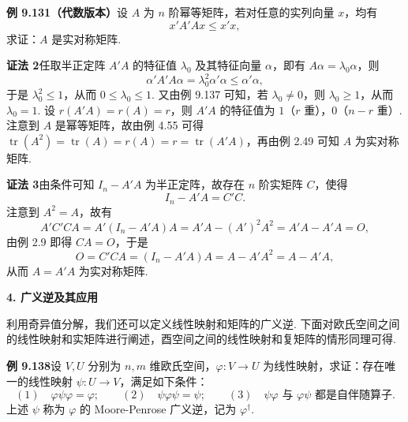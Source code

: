 \documentclass[UTF8,12pt,a4paper,fontset=fandol]{ctexart}
\begin{document}
\noindent\textbf{例 9.131（代数版本）}\quad 设 $A$ 为 $n$ 阶幂等矩阵，若对任意的实列向量 $x$，均有
\[
x'A'Ax\le x'x,
\]
求证：$A$ 是实对称矩阵.

\noindent\textbf{证法 2}\quad 任取半正定阵 $A'A$ 的特征值 $\lambda_0$ 及其特征向量 $\alpha$，即有 $A\alpha=\lambda_0\alpha$，则
\[
\alpha'A'A\alpha=\lambda_0^2\alpha'\alpha\le\alpha'\alpha,
\]
于是 $\lambda_0^2\le1$，从而 $0\le\lambda_0\le1$. 又由例 9.137 可知，若 $\lambda_0\ne0$，则 $\lambda_0\ge1$，从而 $\lambda_0=1$. 设 $r(A'A)=r(A)=r$，则 $A'A$ 的特征值为 $1$（$r$ 重），$0$（$n-r$ 重）. 注意到 $A$ 是幂等矩阵，故由例 4.55 可得 $\operatorname{tr}(A^2)=\operatorname{tr}(A)=r(A)=r=\operatorname{tr}(A'A)$，再由例 2.49 可知 $A$ 为实对称矩阵.

\noindent\textbf{证法 3}\quad 由条件可知 $I_n-A'A$ 为半正定阵，故存在 $n$ 阶实矩阵 $C$，使得
\[
I_n-A'A=C'C.
\]
注意到 $A^2=A$，故有
\[
A'C'CA=A'(I_n-A'A)A=A'A-(A')^2A^2=A'A-A'A=O,
\]
由例 2.9 即得 $CA=O$，于是
\[
O=C'CA=(I_n-A'A)A=A-A'A^2=A-A'A,
\]
从而 $A=A'A$ 为实对称矩阵.

\noindent\textbf{4. 广义逆及其应用}

利用奇异值分解，我们还可以定义线性映射和矩阵的广义逆. 下面对欧氏空间之间的线性映射和实矩阵进行阐述，酉空间之间的线性映射和复矩阵的情形同理可得.

\noindent\textbf{例 9.138}\quad 设 $V,U$ 分别为 $n,m$ 维欧氏空间，$\varphi:V\to U$ 为线性映射，求证：存在唯一的线性映射 $\psi:U\to V$，满足如下条件：
\[
(1)\quad \varphi\psi\varphi=\varphi;\qquad
(2)\quad \psi\varphi\psi=\psi;\qquad
(3)\quad \psi\varphi\text{ 与 }\varphi\psi\text{ 都是自伴随算子.}
\]
上述 $\psi$ 称为 $\varphi$ 的 Moore-Penrose 广义逆，记为 $\varphi^\dagger$.
\end{document}
